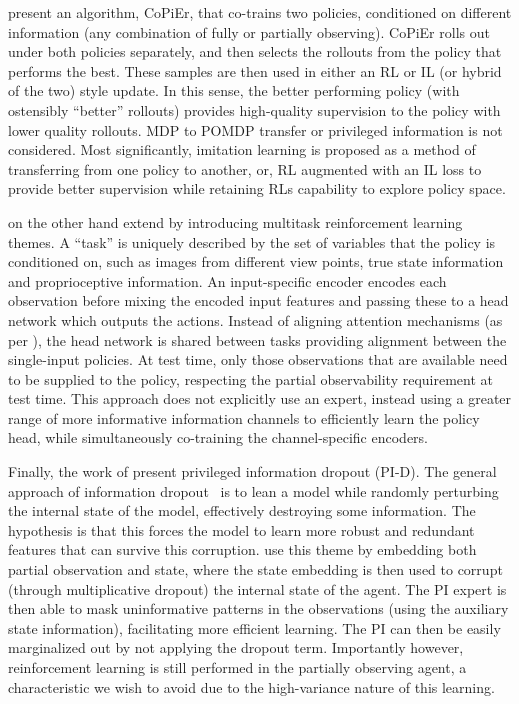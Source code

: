 \citet{Song2019} present an algorithm, CoPiEr, that co-trains two policies, conditioned on different information (any combination of fully or partially observing).  CoPiEr rolls out under both policies separately, and then selects the rollouts from the policy that performs the best.  These samples are then used in either an RL or IL (or hybrid of the two) style update.  In this sense, the better performing policy (with ostensibly ``better'' rollouts) provides high-quality supervision to the policy with lower quality rollouts.  MDP to POMDP transfer or privileged information is not considered.  Most significantly, imitation learning is proposed as a method of transferring from one policy to another, or, RL augmented with an IL loss to provide better supervision while retaining RLs capability to explore policy space. 

\citet{Schwab2019} on the other hand extend \citet{pinto2017asymmetric} by introducing multitask reinforcement learning themes.  A ``task'' is uniquely described by the set of variables that the policy is conditioned on, such as images from different view points, true state information and proprioceptive information.  An input-specific encoder encodes each observation before mixing the encoded input features and passing these to a head network which outputs the actions.  Instead of aligning attention mechanisms (as per \citet{salter2019attentionprivileged}), \citet{Schwab2019} the head network is shared between tasks providing alignment between the single-input policies.  At test time, only those observations that are available need to be supplied to the policy, respecting the partial observability requirement at test time.  This approach does not explicitly use an expert, instead using a greater range of more informative information channels to efficiently learn the policy head, while simultaneously co-training the channel-specific encoders.

Finally, the work of \citet{pierrealex2020privileged} present privileged information dropout (PI-D).  The general approach of information dropout~\citep{Achille_2018} is to lean a model while randomly perturbing the internal state of the model, effectively destroying some information.  The hypothesis is that this forces the model to learn more robust and redundant features that can survive this corruption.  \citet{pierrealex2020privileged} use this theme by embedding both partial observation and state, where the state embedding is then used to corrupt (through multiplicative dropout) the internal state of the agent.  The PI expert is then able to mask uninformative patterns in the observations (using the auxiliary state information), facilitating more efficient learning.  The PI can then be easily marginalized out by not applying the dropout term.  Importantly however, reinforcement learning is still performed in the partially observing agent, a characteristic we wish to avoid due to the high-variance nature of this learning. 
